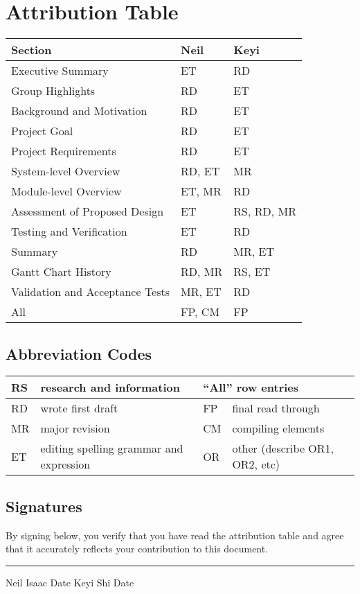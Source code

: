 \thispagestyle{empty}

\section*{Attribution Table}

\begin{tabular}{|l|l|l|}
	\hline
	\textbf{Section} & \textbf{Neil} & \textbf{Keyi} \\
	\hline \hline
	Executive Summary & ET & RD \\
	Group Highlights & RD & ET \\
	\hline
	Background and Motivation & RD & ET \\
	Project Goal & RD & ET \\
	Project Requirements & RD & ET \\
	\hline
	System-level Overview & RD, ET & MR \\
	Module-level Overview & ET, MR & RD \\
	Assessment of Proposed Design & ET & RS, RD, MR \\
	\hline
	Testing and Verification & ET & RD \\
	\hline
	Summary & RD  & MR, ET \\
	\hline
	Gantt Chart History & RD, MR & RS, ET \\
	Validation and Acceptance Tests & MR, ET & RD \\
	\hline
	All & FP, CM & FP \\
	\hline
\end{tabular}

\subsection*{Abbreviation Codes}

\begin{tabular}[width=7in]{|l|l||l|l|}
	\hline
	RS & research and information & \multicolumn{2}{l|}{``All'' row entries} \\ \hline
	RD & wrote first draft & FP & final read through \\ \hline
	MR & major revision & CM & compiling elements \\ \hline
	ET & editing spelling grammar and expression & OR & other (describe OR1, OR2, etc) \\ \hline
\end{tabular}

\subsection*{Signatures}

By signing below, you verify that you have read the attribution table and agree that it accurately reflects your contribution to this document.

\vfill

\hrule
Neil Isaac \hspace{1in} Date \hspace{1in} Keyi Shi \hspace{1in} Date

